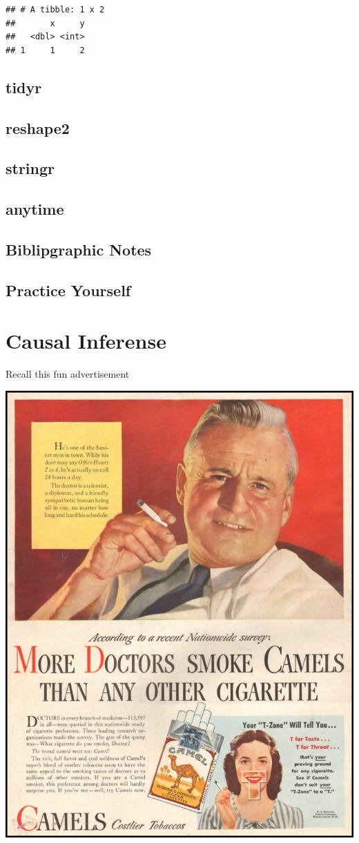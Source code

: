 \documentclass[]{book}
\theoremstyle{definition}
\theoremstyle{definition}
\theoremstyle{definition}
\theoremstyle{remark}
\begin{document}
\begin{verbatim}
## # A tibble: 1 x 2
##       x     y
##   <dbl> <int>
## 1     1     2
\end{verbatim}

\section{tidyr}\label{tidyr}

\section{reshape2}\label{reshape2}

\section{stringr}\label{stringr}

\section{anytime}\label{anytime}

\section{Biblipgraphic Notes}\label{biblipgraphic-notes-1}

\section{Practice Yourself}\label{practice-yourself-19}

\chapter{Causal Inferense}\label{causality}

Recall this fun advertisement

\includegraphics[width=0.5\linewidth]{art/wor}
\end{document}
